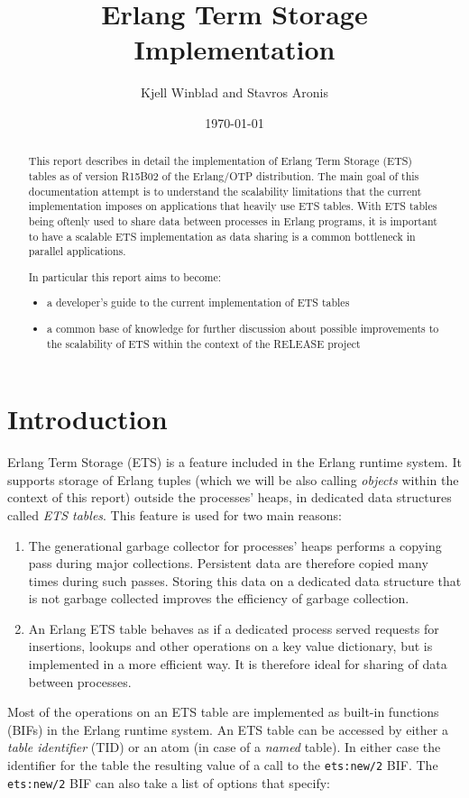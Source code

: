 \documentclass[aps,pre,preprint,nofootinbib]{revtex4}
\begin{document}
\title{Erlang Term Storage Implementation}
\author{Kjell Winblad and Stavros Aronis}
\date{\today}


\begin{abstract}

  This report describes in detail the implementation of Erlang Term Storage (ETS) tables as of version R15B02 of the Erlang/OTP distribution.
  The main goal of this documentation attempt is to understand the scalability limitations that the current implementation imposes on applications that heavily use ETS tables.
  With ETS tables being oftenly used to share data between processes in Erlang programs, it is important to have a scalable ETS implementation as data sharing is a common bottleneck in parallel applications.

  In particular this report aims to become:
  \begin{itemize}
   \item a developer's guide to the current implementation of ETS tables
   \item a common base of knowledge for further discussion about possible improvements to the scalability of ETS within the context of the RELEASE project
  \end{itemize}

\end{abstract}

\maketitle

\section{Introduction}

Erlang Term Storage (ETS) is a feature included in the Erlang runtime system.
It supports storage of Erlang tuples (which we will be also calling \emph{objects} within the context of this report) outside the processes' heaps, in dedicated data structures called \emph{ETS tables}.
This feature is used for two main reasons:
\begin{enumerate}
\item The generational garbage collector for processes' heaps performs a copying pass during major collections.
Persistent data are therefore copied many times during such passes. Storing this data on a dedicated data structure that is not garbage collected improves the efficiency of garbage collection.
\item An Erlang ETS table behaves as if a dedicated process served requests for insertions, lookups and other operations on a key value dictionary, but is implemented in a more efficient way.
It is therefore ideal for sharing of data between processes.
\end{enumerate}
Most of the operations on an ETS table are implemented as built-in functions (BIFs) in the Erlang runtime system.
An ETS table can be accessed by either a \emph{table identifier} (TID) or an atom (in case of a \emph{named} table).
In either case the identifier for the table the resulting value of a call to the \verb|ets:new/2| BIF.
The \verb|ets:new/2| BIF can also take a list of options that specify:
\end{document}
